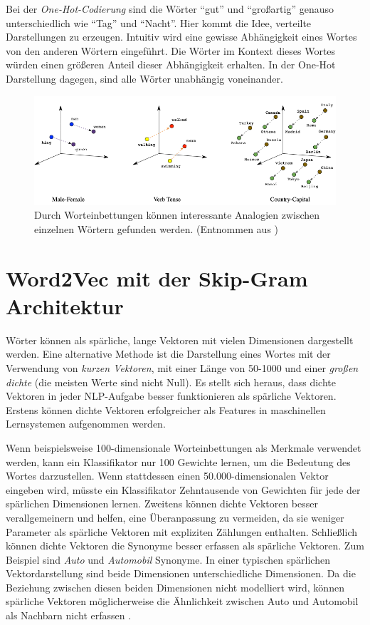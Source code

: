 Bei der \textit{One-Hot-Codierung} sind die Wörter \enquote{gut} und \enquote{großartig}  genauso unterschiedlich wie \enquote{Tag} und \enquote{Nacht}. Hier kommt die Idee, verteilte Darstellungen zu erzeugen. Intuitiv wird eine gewisse Abhängigkeit eines Wortes von den anderen Wörtern eingeführt. Die Wörter im Kontext dieses Wortes würden einen größeren Anteil dieser Abhängigkeit erhalten. In der One-Hot Darstellung dagegen, sind alle Wörter unabhängig voneinander.

\begin{figure}[H]
    \centering
    \includegraphics[width=14cm]{kapitel3/wordem.png}
    \caption[Worteinbettungen erzeugen Analogien zwischen Wörtern]{Durch Worteinbettungen können interessante Analogien zwischen einzelnen Wörtern gefunden werden. (Entnommen aus \cite*{wordemdgood})}
    \label{Word2Vex}
\end{figure}



\section{Word2Vec mit der Skip-Gram Architektur}

Wörter können als spärliche, lange Vektoren mit vielen Dimensionen dargestellt werden. Eine alternative Methode ist die Darstellung eines Wortes mit der Verwendung von \textit{kurzen Vektoren}, mit einer Länge von 50-1000 und einer \textit{großen dichte} (die meisten Werte sind nicht Null). Es stellt sich heraus, dass dichte Vektoren in jeder NLP-Aufgabe besser funktionieren als spärliche Vektoren. Erstens können dichte Vektoren erfolgreicher als Features in maschinellen Lernsystemen aufgenommen werden.

Wenn beispielsweise 100-dimensionale Worteinbettungen als Merkmale verwendet werden, kann ein Klassifikator nur 100 Gewichte lernen, um die Bedeutung des Wortes darzustellen. Wenn  stattdessen einen 50.000-dimensionalen Vektor eingeben wird, müsste ein Klassifikator Zehntausende von Gewichten für jede der spärlichen Dimensionen lernen. Zweitens können dichte Vektoren besser verallgemeinern und helfen, eine Überanpassung zu vermeiden, da sie weniger Parameter als spärliche Vektoren mit expliziten Zählungen enthalten. Schließlich können dichte Vektoren die Synonyme besser erfassen als spärliche Vektoren. Zum Beispiel sind \textit{Auto} und \textit{Automobil} Synonyme. In einer typischen spärlichen Vektordarstellung sind beide Dimensionen unterschiedliche Dimensionen. Da die Beziehung zwischen diesen beiden Dimensionen nicht modelliert wird, können spärliche Vektoren möglicherweise die Ähnlichkeit zwischen Auto und Automobil als Nachbarn nicht erfassen \cite*[110-111]{Jurafskya}.


